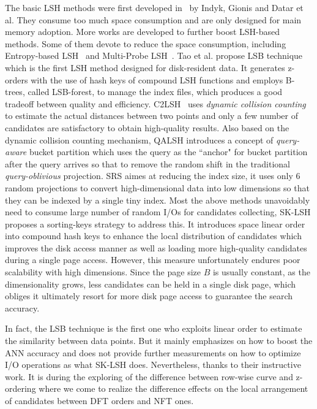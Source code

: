 \documentclass[twocolumn]{svjour3}          %
\begin{document}
The basic LSH methods were first developed in~\cite{Indyk1998LSH,Gionis1999,Datar2004} by Indyk, Gionis and Datar et al. They consume too much space consumption and are only designed for main memory adoption. More works are developed to further boost LSH-based methods.
Some of them devote to reduce the space consumption, including Entropy-based LSH~\cite{Panigrahy2006} and Multi-Probe LSH~\cite{Lv2007,Joly2008}. 
Tao et al. propose LSB technique~\cite{Tao2009LSB} which is the first LSH method designed for disk-resident data. It generates z-orders with the use of hash keys of compound LSH functions and employs B-trees, called LSB-forest, to manage the index files, which produces a good tradeoff between quality and efficiency. C2LSH~\cite{Gan2012C2LSH} uses \emph{dynamic collision counting} to estimate the actual distances between two points and only a few number of candidates are satisfactory to obtain high-quality results.
Also based on the dynamic collision counting mechanism, QALSH introduces a concept of \emph{query-aware} bucket partition which uses the query as the ``anchor" for bucket partition after the query arrives so that to remove the random shift in the traditional \emph{query-oblivious} projection.
SRS aimes at reducing the index size, it uses only 6 random projections to convert high-dimensional data into low dimensions so that they can be indexed by a single tiny index.
Most the above methods unavoidably need to consume large number of random I/Os for candidates collecting, SK-LSH proposes a sorting-keys strategy to address this. It introduces space linear order into compound hash keys to enhance the local distribution of candidates which improves the disk access manner as well as loading more high-quality candidates during a single page access. However, this measure unfortunately endures poor scalability with high dimensions. Since the page size $B$ is usually constant, as the dimensionality grows, less candidates can be held in a single disk page, which obliges it ultimately resort for more disk page access to guarantee the search accuracy.

In fact, the LSB technique is the first one who exploits linear order to estimate the similarity between data points. But it mainly emphasizes on how to boost the ANN accuracy and does not provide further measurements on how to optimize I/O operations as what SK-LSH does. Nevertheless, thanks to their instructive work. It is during the exploring of the difference between row-wise curve and z-ordering where we come to realize the difference effects on the local arrangement of candidates between DFT orders and NFT ones.
\end{document}

